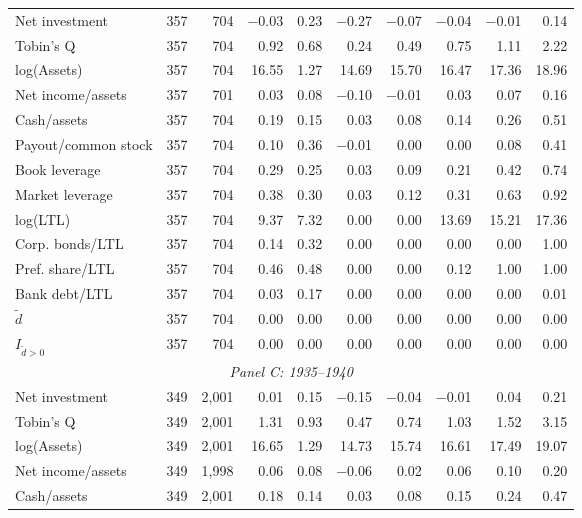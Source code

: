 \begin{table}[p]
\begin{threeparttable}
\begin{tabular}{lrrrrrrrrr}
            \midrule
            Net investment & 357 & 704 & $-$0.03 & 0.23 & $-$0.27 & $-$0.07 & $-$0.04 & $-$0.01 & 0.14 \\
            Tobin's Q & 357 & 704 & 0.92 & 0.68 & 0.24 & 0.49 & 0.75 & 1.11 & 2.22 \\
            log(Assets) & 357 & 704 & 16.55 & 1.27 & 14.69 & 15.70 & 16.47 & 17.36 & 18.96 \\
            Net income/assets & 357 & 701 & 0.03 & 0.08 & $-$0.10 & $-$0.01 & 0.03 & 0.07 & 0.16 \\
            Cash/assets & 357 & 704 & 0.19 & 0.15 & 0.03 & 0.08 & 0.14 & 0.26 & 0.51 \\
            Payout/common stock & 357 & 704 & 0.10 & 0.36 & $-$0.01 & 0.00 & 0.00 & 0.08 & 0.41 \\
            Book leverage & 357 & 704 & 0.29 & 0.25 & 0.03 & 0.09 & 0.21 & 0.42 & 0.74 \\
            Market leverage & 357 & 704 & 0.38 & 0.30 & 0.03 & 0.12 & 0.31 & 0.63 & 0.92 \\
            log(LTL) & 357 & 704 & 9.37 & 7.32 & 0.00 & 0.00 & 13.69 & 15.21 & 17.36 \\
            Corp. bonds/LTL & 357 & 704 & 0.14 & 0.32 & 0.00 & 0.00 & 0.00 & 0.00 & 1.00 \\
            Pref. share/LTL & 357 & 704 & 0.46 & 0.48 & 0.00 & 0.00 & 0.12 & 1.00 & 1.00 \\
            Bank debt/LTL & 357 & 704 & 0.03 & 0.17 & 0.00 & 0.00 & 0.00 & 0.00 & 0.01 \\
            \ensuremath{\tilde{d}} & 357 & 704 & 0.00 & 0.00 & 0.00 & 0.00 & 0.00 & 0.00 & 0.00 \\
            \ensuremath{I_{\tilde{d}>0}} & 357 & 704 & 0.00 & 0.00 & 0.00 & 0.00 & 0.00 & 0.00 & 0.00 \\
            \midrule
            \multicolumn{10}{c}{\textit{Panel C: 1935--1940}} \\
            \midrule
            Net investment & 349 & 2,001 & 0.01 & 0.15 & $-$0.15 & $-$0.04 & $-$0.01 & 0.04 & 0.21 \\
            Tobin's Q & 349 & 2,001 & 1.31 & 0.93 & 0.47 & 0.74 & 1.03 & 1.52 & 3.15 \\
            log(Assets) & 349 & 2,001 & 16.65 & 1.29 & 14.73 & 15.74 & 16.61 & 17.49 & 19.07 \\
            Net income/assets & 349 & 1,998 & 0.06 & 0.08 & $-$0.06 & 0.02 & 0.06 & 0.10 & 0.20 \\
            Cash/assets & 349 & 2,001 & 0.18 & 0.14 & 0.03 & 0.08 & 0.15 & 0.24 & 0.47 \\

\end{tabular}
\end{threeparttable}
\end{table}
